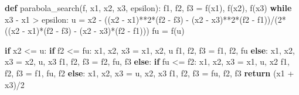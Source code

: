 \documentclass[
  russian,
  letterpaper,
  DIV=11,
  numbers=noendperiod]{scrartcl}
\newenvironment{Shaded}{\begin{snugshade}}{\end{snugshade}}
\newcommand{\ControlFlowTok}[1]{\textcolor[rgb]{0.00,0.23,0.31}{\textbf{#1}}}
\newcommand{\DecValTok}[1]{\textcolor[rgb]{0.68,0.00,0.00}{#1}}
\newcommand{\KeywordTok}[1]{\textcolor[rgb]{0.00,0.23,0.31}{\textbf{#1}}}
\newcommand{\NormalTok}[1]{\textcolor[rgb]{0.00,0.23,0.31}{#1}}
\newcommand{\OperatorTok}[1]{\textcolor[rgb]{0.37,0.37,0.37}{#1}}
\begin{document}
\begin{Shaded}
\begin{Highlighting}[]
\KeywordTok{def}\NormalTok{ parabola\_search(f, x1, x2, x3, epsilon):}
\NormalTok{   f1, f2, f3 }\OperatorTok{=}\NormalTok{ f(x1), f(x2), f(x3)}
   \ControlFlowTok{while}\NormalTok{ x3 }\OperatorTok{{-}}\NormalTok{ x1 }\OperatorTok{\textgreater{}}\NormalTok{ epsilon:}
\NormalTok{      u }\OperatorTok{=}\NormalTok{ x2 }\OperatorTok{{-}}\NormalTok{ ((x2 }\OperatorTok{{-}}\NormalTok{ x1)}\OperatorTok{**}\DecValTok{2}\OperatorTok{*}\NormalTok{(f2 }\OperatorTok{{-}}\NormalTok{ f3) }\OperatorTok{{-}}\NormalTok{ (x2 }\OperatorTok{{-}}\NormalTok{ x3)}\OperatorTok{**}\DecValTok{2}\OperatorTok{*}\NormalTok{(f2 }\OperatorTok{{-}}\NormalTok{ f1))}\OperatorTok{/}\NormalTok{(}\DecValTok{2}\OperatorTok{*}\NormalTok{((x2 }\OperatorTok{{-}}\NormalTok{ x1)}\OperatorTok{*}\NormalTok{(f2 }\OperatorTok{{-}}\NormalTok{ f3) }\OperatorTok{{-}}\NormalTok{ (x2 }\OperatorTok{{-}}\NormalTok{ x3)}\OperatorTok{*}\NormalTok{(f2 }\OperatorTok{{-}}\NormalTok{ f1)))}
\NormalTok{      fu }\OperatorTok{=}\NormalTok{ f(u)}

      \ControlFlowTok{if}\NormalTok{ x2 }\OperatorTok{\textless{}=}\NormalTok{ u:}
         \ControlFlowTok{if}\NormalTok{ f2 }\OperatorTok{\textless{}=}\NormalTok{ fu:}
\NormalTok{            x1, x2, x3 }\OperatorTok{=}\NormalTok{ x1, x2, u}
\NormalTok{            f1, f2, f3 }\OperatorTok{=}\NormalTok{ f1, f2, fu}
         \ControlFlowTok{else}\NormalTok{:}
\NormalTok{            x1, x2, x3 }\OperatorTok{=}\NormalTok{ x2, u, x3}
\NormalTok{            f1, f2, f3 }\OperatorTok{=}\NormalTok{ f2, fu, f3}
      \ControlFlowTok{else}\NormalTok{:}
         \ControlFlowTok{if}\NormalTok{ fu }\OperatorTok{\textless{}=}\NormalTok{ f2:}
\NormalTok{            x1, x2, x3 }\OperatorTok{=}\NormalTok{ x1, u, x2}
\NormalTok{            f1, f2, f3 }\OperatorTok{=}\NormalTok{ f1, fu, f2}
         \ControlFlowTok{else}\NormalTok{:}
\NormalTok{            x1, x2, x3 }\OperatorTok{=}\NormalTok{ u, x2, x3}
\NormalTok{            f1, f2, f3 }\OperatorTok{=}\NormalTok{ fu, f2, f3}
   \ControlFlowTok{return}\NormalTok{ (x1 }\OperatorTok{+}\NormalTok{ x3)}\OperatorTok{/}\DecValTok{2}
\end{Highlighting}
\end{Shaded}
\end{document}
